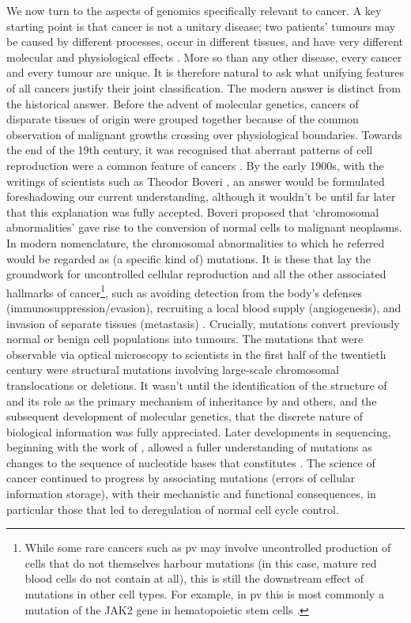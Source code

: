 \documentclass[thesis.tex]{subfiles}
\begin{document}
We now turn to the aspects of genomics specifically relevant to cancer. A key starting point is that cancer is not a unitary disease;  two patients’ tumours may be caused by different processes, occur in different tissues, and have very different molecular and physiological effects \citep{wittekind_tnm_2016}. More so than any other disease, every cancer and every tumour are unique. It is therefore natural to ask what unifying features of all cancers justify their joint classification. The modern answer is distinct from the historical answer. Before the advent of molecular genetics, cancers of disparate tissues of origin were grouped together because of the common observation of malignant growths crossing over physiological boundaries. Towards the end of the 19th century, it was recognised that aberrant patterns of cell reproduction were a common feature of cancers \citep{weinstein_history_2008}. By the early 1900s, with the writings of scientists such as Theodor Boveri \citep[see][for a modern translation]{boveri_concerning_2008}, an answer would be formulated foreshadowing our current understanding, although it wouldn't be until far later that this explanation was fully accepted. Boveri proposed that `chromosomal abnormalities' gave rise to the conversion of normal cells to malignant neoplasms. In modern nomenclature, the chromosomal abnormalities to which he referred would be regarded as (a specific kind of) mutations. It is these that lay the groundwork for uncontrolled cellular reproduction and all the other associated hallmarks of cancer\footnote{While some rare cancers such as \gls{pv} may involve uncontrolled production of cells that do not themselves harbour mutations (in this case, mature red blood cells do not contain  at all), this is still the downstream effect of mutations in other cell types. For example, in \gls{pv} this is most commonly a mutation of the {JAK2} gene in hematopoietic stem cells \citep{tefferi_jak2_2007}.}, such as avoiding detection from the body's defenses (immunosuppression/evasion), recruiting a local blood supply (angiogenesis), and invasion of separate tissues (metastasis) \citep{hanahan_hallmarks_2011}. Crucially, mutations convert previously normal or benign cell populations into tumours. The mutations that were observable via optical microscopy to scientists in the first half of the twentieth century were structural mutations involving large-scale chromosomal translocations or deletions. It wasn't until the identification of the structure of  and its role as the primary mechanism of inheritance by \citet{watson_molecular_1953} and others, and the subsequent development of molecular genetics, that the discrete nature of biological information was fully appreciated. Later developments in  sequencing, beginning with the work of \citet{sanger_dna_1977}, allowed a fuller understanding of mutations as changes to the sequence of nucleotide bases that constitutes . The science of cancer continued to progress by associating  mutations (errors of cellular information storage), with their mechanistic and functional consequences, in particular those that led to deregulation of normal cell cycle control.
\end{document}
